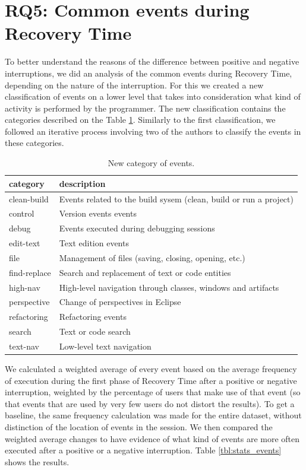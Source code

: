 \documentclass[times]{smrauth}
\begin{document}
\section{RQ5: Common events during Recovery Time}

To better understand the reasons of the difference between positive and negative interruptions, we did an analysis of the common events during Recovery Time, depending on the nature of the interruption. For this we created a new classification of events on a lower level that takes into consideration what kind of activity is performed by the programmer. The new classification contains the categories described on the Table \ref{tbl:new_events_udc}. Similarly to the first classification, we followed an iterative process involving two of the authors to classify the events in these categories. 

\begin{table}[ht!]
\tiny
\renewcommand{\arraystretch}{1.3}
\caption{New category of events. }
\label{tbl:new_events_udc}
\centering
\begin{tabular}{|p{2.5cm}|p{7 cm}|} 
  \hline 
category & description \\  
  \hline 
    \hline 
clean-build &  Events related to the build sysem (clean, build or run a project) \\
control & Version events events \\
debug & Events executed during debugging sessions  \\
edit-text & Text edition events  \\
file & Management of files (saving, closing, opening, etc.)  \\
find-replace & Search and replacement of text  or code entities \\
high-nav & High-level navigation through classes, windows and artifacts \\
perspective & Change of perspectives in Eclipse  \\
refactoring & Refactoring events \\
search & Text or code search  \\
text-nav & Low-level text navigation \\

\hline
\end{tabular}
\end{table}

We calculated a weighted average of every event based on the average frequency of execution during the first phase of Recovery Time after a positive or negative interruption, weighted by the percentage of users that make use of that event (so that events that are used by very few users do not distort the results). To get a baseline, the same frequency calculation was made for the entire dataset, without distinction of the location of events in the session. We then compared the weighted average changes to have evidence of what kind of events are more often executed after a positive or a negative interruption. Table \ref{tbl:stats_events} shows the results.
\end{document}
